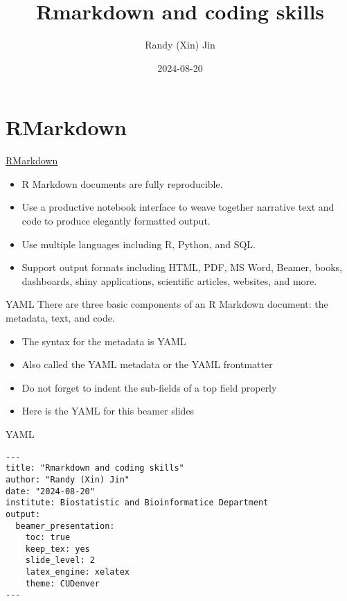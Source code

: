 \documentclass[
  ignorenonframetext,
]{beamer}
\title{Rmarkdown and coding skills}
\author{Randy (Xin) Jin}
\date{2024-08-20}
\institute{Biostatistic and Bioinformatic Department}
\begin{document}
\frame{\titlepage}

\begin{frame}[allowframebreaks]
  \tableofcontents[hideallsubsections]
\end{frame}
\section{RMarkdown}\label{rmarkdown}

\begin{frame}{\href{http://rmarkdown.rstudio.com}{RMarkdown}}
\label{rmarkdown-1}
\begin{itemize}
\item
  R Markdown documents are fully reproducible.
\item
  Use a productive notebook interface to weave together narrative text
  and code to produce elegantly formatted output.
\item
  Use multiple languages including R, Python, and SQL.
\item
  Support output formats including HTML, PDF, MS Word, Beamer, books,
  dashboards, shiny applications, scientific articles, websites, and
  more.
\end{itemize}
\end{frame}

\begin{frame}{YAML}
\label{yaml}
There are three basic components of an R Markdown document: the
metadata, text, and code.

\begin{itemize}
\item
  The syntax for the metadata is YAML
\item
  Also called the YAML metadata or the YAML frontmatter
\item
  Do not forget to indent the sub-fields of a top field properly
\item
  Here is the YAML for this beamer slides
\end{itemize}
\end{frame}

\begin{frame}[fragile]{YAML}
\label{yaml-1}
\begin{verbatim}
---
title: "Rmarkdown and coding skills"
author: "Randy (Xin) Jin"
date: "2024-08-20"
institute: Biostatistic and Bioinformatice Department
output:
  beamer_presentation:
    toc: true
    keep_tex: yes
    slide_level: 2
    latex_engine: xelatex
    theme: CUDenver
---
\end{verbatim}
\end{frame}
\end{document}
